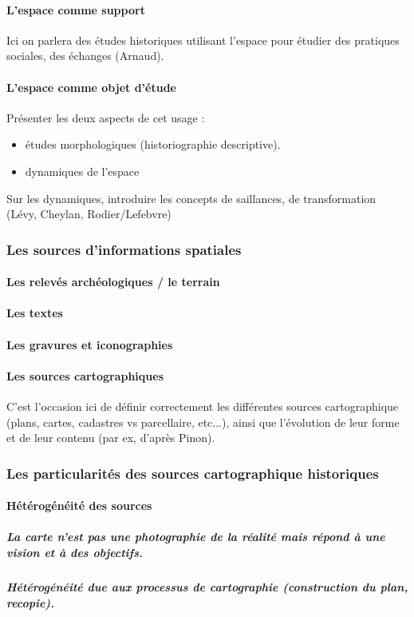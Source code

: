 \documentclass[a4paper,10pt]{article}
\begin{document}
\paragraph{L'espace comme support}
Ici on parlera des études historiques utilisant l'espace pour étudier des pratiques sociales, des échanges (Arnaud).
\paragraph{L'espace comme objet d'étude}
Présenter les deux aspects de cet usage :
\begin{itemize}
 \item études morphologiques (historiographie descriptive).
 \item dynamiques de l'espace
\end{itemize}
Sur les dynamiques, introduire les concepts de saillances, de transformation (Lévy, Cheylan, Rodier/Lefebvre)

\subsubsection{Les sources d'informations spatiales}
\paragraph{Les relevés archéologiques / le terrain}
\paragraph{Les textes}
\paragraph{Les gravures et iconographies}
\paragraph{Les sources cartographiques}
C'est l'occasion ici de définir correctement les différentes sources cartographique (plans, cartes, cadastres vs parcellaire, etc...),
ainsi que l'évolution de leur forme et de leur contenu (par ex, d'après Pinon).


\subsubsection{Les particularités des sources cartographique historiques}
\paragraph{Hétérogénéité des sources}
\subparagraph{La carte n'est pas une photographie de la réalité mais répond à une vision et à des objectifs.}
\subparagraph{Hétérogénéité due aux processus de cartographie (construction du plan, recopie).}
\end{document}
